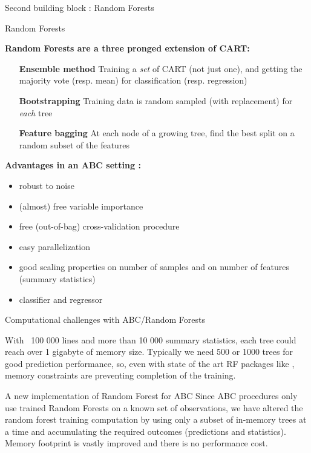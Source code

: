 \documentclass[final]{beamer}
\newlength{\colwidth}
\begin{document}
\begin{frame}[t]
\begin{columns}[t]
\begin{column}{\colwidth}
\begin{block}{Second building block : Random Forests}
\begin{block}{Random Forests}
      \begin{multicols}{2}
        \textbf{Random Forests \cite{breiman:2001} are a three pronged extension of CART:}
        \begin{itemize}
          \item[\textbf{Ensemble method}] Training a \emph{set} of CART (not just one), and getting the majority vote (resp. mean) for classification (resp. regression)
          \item[\textbf{Bootstrapping}] Training data is random sampled (with replacement) for \emph{each} tree
          \item[\textbf{Feature bagging}] At each node of a growing tree, find the best split on a random subset of the features 
        \end{itemize}
        \columnbreak
         \centering
        \textbf{Advantages in an ABC setting : }
        \justify
        \begin{itemize}
          \item robust to noise
          \item (almost) free variable importance
          \item free (out-of-bag) cross-validation procedure
          \item easy parallelization
          \item good scaling properties on number of samples and on number of features (summary statistics)
          \item classifier and regressor
        \end{itemize}  
          
      \end{multicols}


    \end{block}
  \end{block}

  \begin{alertblock}{Computational challenges with ABC/Random Forests}

    With ~100 000 lines and more than 10 000 summary statistics, each tree could reach over 1 gigabyte of memory size. Typically we need 500 or 1000 trees for good prediction performance, so, even with state of the art RF packages like \cite{wright2015ranger}, memory constraints are preventing completion of the training.
    
  \end{alertblock}
  \begin{block}{A new implementation of Random Forest for ABC}
    Since ABC procedures only use trained Random Forests on a known set of observations, we have altered the random forest training computation by using only a subset of in-memory trees at a time and accumulating the required outcomes (predictions and statistics). Memory footprint is vastly improved and there is no performance cost.


\end{block}
\end{column}
\end{columns}
\end{frame}
\end{document}
